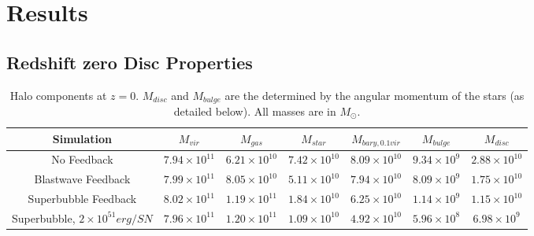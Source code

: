 \section{Results}
\subsection{Redshift zero Disc Properties}
\begin{table}
    \scriptsize
    \begin{tabular}{ c c c c c c c}
        \hline
        Simulation & $M_{vir}$ & $M_{gas}$ &
        $M_{star}$  &$M_{bary,0.1vir}$ & $M_{bulge}$ & $M_{disc}$ \\
        \hline
        No Feedback & $7.94\times10^{11}$ & $6.21\times10^{10}$ &
        $7.42\times10^{10}$ & $8.09\times10^{10}$ & $9.34\times10^{9}$ &
        $2.88\times10^{10}$\\
        Blastwave Feedback & $7.99\times10^{11}$ & $8.05\times10^{10}$ &
        $5.11\times10^{10}$ & $7.94\times10^{10}$ & $8.09\times10^{9}$ &
        $1.75\times10^{10}$ \\
        Superbubble Feedback & $8.02\times10^{11}$ & $1.19\times10^{11}$ &
        $1.84\times10^{10}$ & $6.25\times10^{10}$ & $1.14\times10^{9}$ &
        $1.15\times10^{10}$ \\
        Superbubble, $2\times10^{51} erg/SN$ & $7.96\times10^{11}$ &
        $1.20\times10^{11}$ & $1.09\times10^{10}$ &  $4.92\times10^{10}$ & 
        $5.96\times10^{8}$ & $6.98\times10^9$\\
    \end{tabular}
    \caption[Halo Components at $z=0$ for different feedback models]{Halo
    components at $z=0$. $M_{disc}$ and $M_{bulge}$ are the determined by the
    angular momentum of the stars (as detailed below).  All masses are in
    $M_\odot$.}
    \label{properties2}
\end{table}


